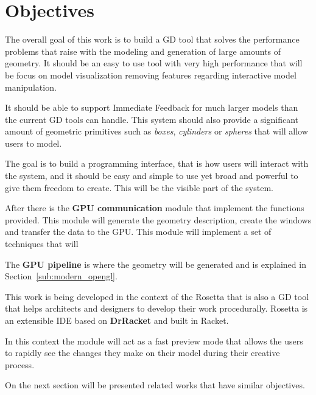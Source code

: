 
% 
% 

\section{Objectives}
\label{sec:objectives}


The overall goal of this work is to build a GD tool that solves the performance problems that raise with the modeling and generation of large amounts of geometry. It should be an easy to use tool with very high performance that will be focus on model visualization removing features regarding interactive model manipulation.

It should be able to support Immediate Feedback for much larger models than the current GD tools can handle. This system should also provide a significant amount of geometric primitives such as \emph{boxes}, \emph{cylinders} or \emph{spheres} that will allow users to model.



The goal is to build a programming interface, that is how users will interact with the system, and it should be easy and simple to use yet broad and powerful to give them freedom to create. This will be the visible part of the system. 

After there is the \textbf{GPU communication} module that implement the functions provided. This module will generate the geometry description, create the windows and transfer the data to the GPU. This module will implement a set of techniques that will 

The \textbf{GPU pipeline} is where the geometry will be generated and is explained in Section~\ref{sub:modern_opengl}.


This work is being developed in the context of the Rosetta that is also a GD tool that helps architects and designers to develop their work procedurally. Rosetta is an extensible IDE based on \textbf{DrRacket} and built in Racket. 

In this context the module will act as a fast preview mode that allows the users to rapidly see the changes they make on their model during their creative process.

On the next section will be presented related works that have similar objectives.


